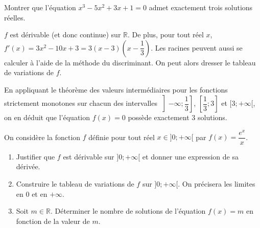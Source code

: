 \documentclass[11pt,fleqn, openany]{book} %
\begin{document}
\begin{exercise}Montrer que l'équation $x^3-5x^2+3x+1=0$ admet exactement trois solutions réelles.\end{exercise}

\begin{solution} $f$ est dérivable (et donc continue) sur $\mathbb{R}$. De plus, pour tout réel $x$, $f'(x)=3x^2-10x+3=3(x-3)\left(x-\dfrac{1}{3}\right)$. Les racines peuvent aussi se calculer à l'aide de la méthode du discriminant. On peut alors dresser le tableau de variations de $f$.

\begin{center}
\end{center}

En appliquant le théorème des valeurs intermédiaires pour les fonctions strictement monotones sur chacun des intervalles $\left]-\infty ; \dfrac{1}{3}\right ]$, $\left[ \dfrac{1}{3}; 3 \right]$ et $[3;+\infty [$, on en déduit que l'équation $f(x)=0$ possède exactement 3 solutions.\end{solution}




\begin{exercise}[subtitle={(Métropole 2021)}]

On considère la fonction $f$ définie pour tout réel $x\in ]0;+\infty[$ par $f(x)=\dfrac{e^x}{x}$. 
\begin{enumerate}
\item Justifier que $f$ est dérivable sur $]0;+\infty[$ et donner une expression de sa dérivée.
\item Construire le tableau de variations de $f$ sur $]0;+\infty[$. On précisera les limites en $0$ et en $+\infty$.
\item Soit $m\in\mathbb{R}$. Déterminer le nombre de solutions de l'équation $f(x)=m$ en fonction de la valeur de $m$.
\end{enumerate}
\end{exercise}
\end{document}
